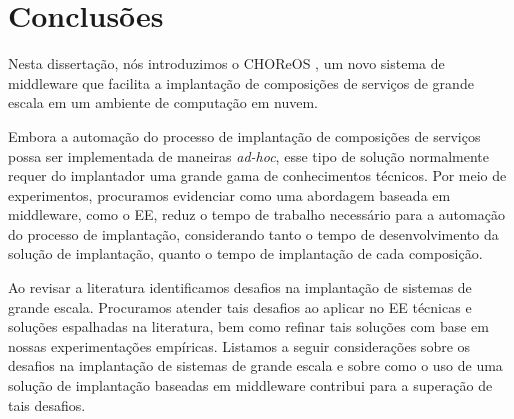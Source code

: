 \chapter{Conclusões}
\label{cap:conclusoes}

Nesta dissertação, nós introduzimos o CHOReOS \ee,
um novo sistema de middleware que facilita a implantação de composições
de serviços de grande escala em um ambiente de computação em nuvem.

Embora a automação do processo de implantação de composições de serviços
possa ser implementada de maneiras \emph{ad-hoc},
esse tipo de solução normalmente requer do implantador
uma grande gama de conhecimentos técnicos.
Por meio de experimentos, procuramos evidenciar como
uma abordagem baseada em middleware, como o EE,
reduz o tempo de trabalho necessário para a automação
do processo de implantação, considerando tanto o tempo
de desenvolvimento da solução de implantação,
quanto o tempo de implantação de cada composição.

Ao revisar a literatura identificamos desafios na implantação
de sistemas de grande escala. 
Procuramos atender tais desafios ao aplicar no EE
técnicas e soluções espalhadas na literatura,
bem como refinar tais soluções com base em 
nossas experimentações empíricas.
Listamos a seguir considerações sobre os desafios na
implantação de sistemas de grande escala
e sobre como o uso de uma solução de implantação
baseadas em middleware contribui para a superação
de tais desafios.

